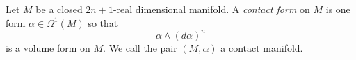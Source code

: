 
 
    Let $M$ be a closed $2n+1$-real dimensional manifold. A \emph{contact form} on $M$ is one form $\alpha\in \Omega^1(M)$ so that 
    \[\alpha \wedge (d\alpha)^n \]
    is a volume form on $M$. We call the pair $(M, \alpha)$ a contact manifold.
    \label{def:contactManifold}
 